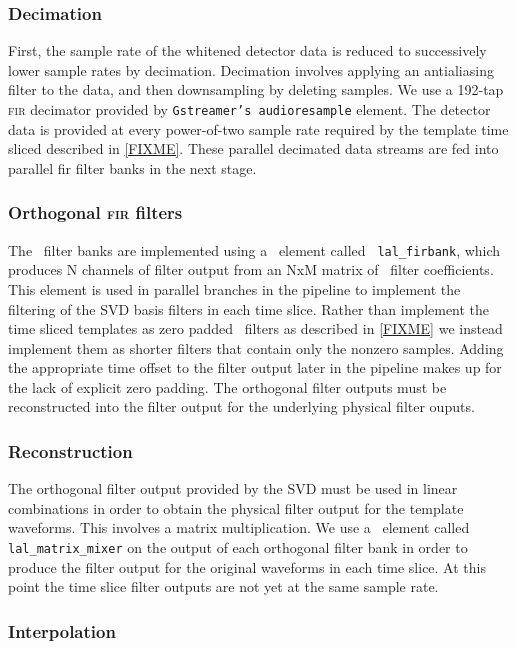 \subsubsection{Decimation}

First, the sample rate of the whitened detector data is reduced to successively
lower sample rates by decimation.  Decimation involves applying an antialiasing
filter to the data, and then downsampling by deleting samples.  We use a
192-tap \textsc{fir} decimator provided by {\tt Gstreamer's audioresample}
element.  The detector data is provided at every power-of-two sample rate
required by the template time sliced described in \eqref{FIXME}.  These
parallel decimated data streams are fed into parallel fir filter banks in the
next stage.

\subsubsection{Orthogonal \textsc{fir} filters}

The \fir\ filter banks are implemented using a \gstlal\ element called {\tt
lal\_firbank}, which produces N channels of filter output from an NxM matrix of
\fir\ filter coefficients.  This element is used in parallel branches in the
pipeline to implement the filtering of the SVD basis filters in each time
slice.  Rather than implement the time sliced templates as zero padded \fir\
filters as described in \eqref{FIXME} we instead implement them as shorter
filters that contain only the nonzero samples.  Adding the appropriate time
offset to the filter output later in the pipeline makes up for the lack of
explicit zero padding.  The orthogonal filter outputs must be reconstructed
into the filter output for the underlying physical filter ouputs. 

\subsubsection{Reconstruction}

The orthogonal filter output provided by the SVD must be used in linear
combinations in order to obtain the physical filter output for the template
waveforms.  This involves a matrix multiplication.  We use a \gstlal\ element
called {\tt lal\_matrix\_mixer} on the output of each orthogonal filter bank in
order to produce the filter output for the original waveforms in each time
slice.  At this point the time slice filter outputs are not yet at the same
sample rate.

\subsubsection{Interpolation}

